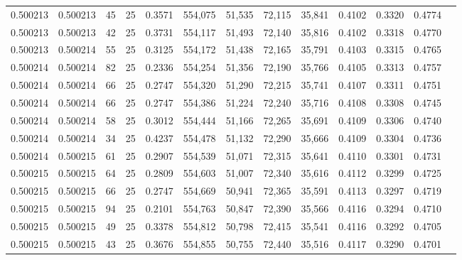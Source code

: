 \begin{tabular}{rrrrrrrrrrrrr}
0.500213 & 0.500213 &    45 &  25 &                                     0.3571 & 554,075 &  51,535 &  72,115 &  35,841 & 0.4102 & 0.3320 & 0.4774 \\
0.500213 & 0.500213 &    42 &  25 &                                     0.3731 & 554,117 &  51,493 &  72,140 &  35,816 & 0.4102 & 0.3318 & 0.4770 \\
0.500213 & 0.500214 &    55 &  25 &                                     0.3125 & 554,172 &  51,438 &  72,165 &  35,791 & 0.4103 & 0.3315 & 0.4765 \\
0.500214 & 0.500214 &    82 &  25 &                                     0.2336 & 554,254 &  51,356 &  72,190 &  35,766 & 0.4105 & 0.3313 & 0.4757 \\
0.500214 & 0.500214 &    66 &  25 &                                     0.2747 & 554,320 &  51,290 &  72,215 &  35,741 & 0.4107 & 0.3311 & 0.4751 \\
0.500214 & 0.500214 &    66 &  25 &                                     0.2747 & 554,386 &  51,224 &  72,240 &  35,716 & 0.4108 & 0.3308 & 0.4745 \\
0.500214 & 0.500214 &    58 &  25 &                                     0.3012 & 554,444 &  51,166 &  72,265 &  35,691 & 0.4109 & 0.3306 & 0.4740 \\
0.500214 & 0.500214 &    34 &  25 &                                     0.4237 & 554,478 &  51,132 &  72,290 &  35,666 & 0.4109 & 0.3304 & 0.4736 \\
0.500214 & 0.500215 &    61 &  25 &                                     0.2907 & 554,539 &  51,071 &  72,315 &  35,641 & 0.4110 & 0.3301 & 0.4731 \\
0.500215 & 0.500215 &    64 &  25 &                                     0.2809 & 554,603 &  51,007 &  72,340 &  35,616 & 0.4112 & 0.3299 & 0.4725 \\
0.500215 & 0.500215 &    66 &  25 &                                     0.2747 & 554,669 &  50,941 &  72,365 &  35,591 & 0.4113 & 0.3297 & 0.4719 \\
0.500215 & 0.500215 &    94 &  25 &                                     0.2101 & 554,763 &  50,847 &  72,390 &  35,566 & 0.4116 & 0.3294 & 0.4710 \\
0.500215 & 0.500215 &    49 &  25 &                                     0.3378 & 554,812 &  50,798 &  72,415 &  35,541 & 0.4116 & 0.3292 & 0.4705 \\
0.500215 & 0.500215 &    43 &  25 &                                     0.3676 & 554,855 &  50,755 &  72,440 &  35,516 & 0.4117 & 0.3290 & 0.4701 \\

\end{tabular}
